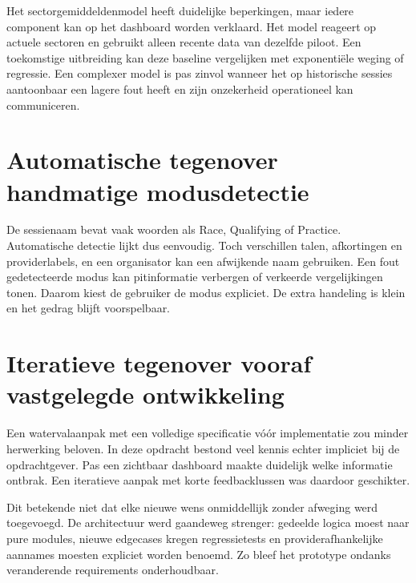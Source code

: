 Het sectorgemiddeldenmodel heeft duidelijke beperkingen, maar iedere component kan op het dashboard worden verklaard. Het model reageert op actuele sectoren en gebruikt alleen recente data van dezelfde piloot. Een toekomstige uitbreiding kan deze baseline vergelijken met exponentiële weging of regressie. Een complexer model is pas zinvol wanneer het op historische sessies aantoonbaar een lagere fout heeft en zijn onzekerheid operationeel kan communiceren.

\section{Automatische tegenover handmatige modusdetectie}
De sessienaam bevat vaak woorden als Race, Qualifying of Practice. Automatische detectie lijkt dus eenvoudig. Toch verschillen talen, afkortingen en providerlabels, en een organisator kan een afwijkende naam gebruiken. Een fout gedetecteerde modus kan pitinformatie verbergen of verkeerde vergelijkingen tonen. Daarom kiest de gebruiker de modus expliciet. De extra handeling is klein en het gedrag blijft voorspelbaar.

\section{Iteratieve tegenover vooraf vastgelegde ontwikkeling}
Een watervalaanpak met een volledige specificatie vóór implementatie zou minder herwerking beloven. In deze opdracht bestond veel kennis echter impliciet bij de opdrachtgever. Pas een zichtbaar dashboard maakte duidelijk welke informatie ontbrak. Een iteratieve aanpak met korte feedbacklussen was daardoor geschikter.

Dit betekende niet dat elke nieuwe wens onmiddellijk zonder afweging werd toegevoegd. De architectuur werd gaandeweg strenger: gedeelde logica moest naar pure modules, nieuwe edgecases kregen regressietests en providerafhankelijke aannames moesten expliciet worden benoemd. Zo bleef het prototype ondanks veranderende requirements onderhoudbaar.

